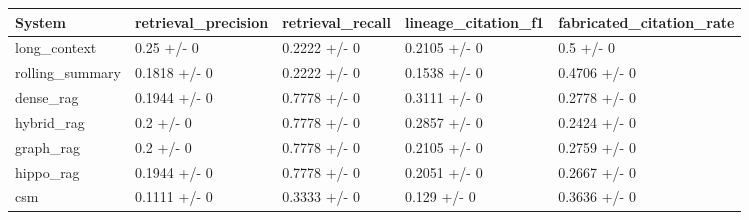 \begin{tabular}{lllll}
System & retrieval_precision & retrieval_recall & lineage_citation_f1 & fabricated_citation_rate \\
\hline
long\_context & 0.25 +/- 0 & 0.2222 +/- 0 & 0.2105 +/- 0 & 0.5 +/- 0 \\
rolling\_summary & 0.1818 +/- 0 & 0.2222 +/- 0 & 0.1538 +/- 0 & 0.4706 +/- 0 \\
dense\_rag & 0.1944 +/- 0 & 0.7778 +/- 0 & 0.3111 +/- 0 & 0.2778 +/- 0 \\
hybrid\_rag & 0.2 +/- 0 & 0.7778 +/- 0 & 0.2857 +/- 0 & 0.2424 +/- 0 \\
graph\_rag & 0.2 +/- 0 & 0.7778 +/- 0 & 0.2105 +/- 0 & 0.2759 +/- 0 \\
hippo\_rag & 0.1944 +/- 0 & 0.7778 +/- 0 & 0.2051 +/- 0 & 0.2667 +/- 0 \\
csm & 0.1111 +/- 0 & 0.3333 +/- 0 & 0.129 +/- 0 & 0.3636 +/- 0 \\
\end{tabular}
